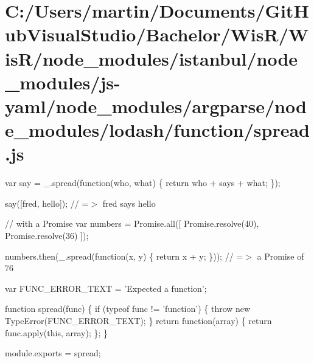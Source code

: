 \hypertarget{_c_1_2_users_2martin_2_documents_2_git_hub_visual_studio_2_bachelor_2_wis_r_2_wis_r_2node_modulea7f316474b757c43d9fdea0493cc8bee}{}\section{C\+:/\+Users/martin/\+Documents/\+Git\+Hub\+Visual\+Studio/\+Bachelor/\+Wis\+R/\+Wis\+R/node\+\_\+modules/istanbul/node\+\_\+modules/js-\/yaml/node\+\_\+modules/argparse/node\+\_\+modules/lodash/function/spread.\+js}
var say = \+\_\+.\+spread(function(who, what) \{ return who + \textquotesingle{} says \textquotesingle{} + what; \});

say(\mbox{[}\textquotesingle{}fred\textquotesingle{}, \textquotesingle{}hello\textquotesingle{}\mbox{]}); // =$>$ \textquotesingle{}fred says hello\textquotesingle{}

// with a Promise var numbers = Promise.\+all(\mbox{[} Promise.\+resolve(40), Promise.\+resolve(36) \mbox{]});

numbers.\+then(\+\_\+.\+spread(function(x, y) \{ return x + y; \})); // =$>$ a Promise of 76


\begin{DoxyCodeInclude}

var FUNC\_ERROR\_TEXT = \textcolor{stringliteral}{'Expected a function'};

\textcolor{keyword}{function} spread(func) \{
  \textcolor{keywordflow}{if} (typeof func != \textcolor{stringliteral}{'function'}) \{
    \textcolor{keywordflow}{throw} \textcolor{keyword}{new} TypeError(FUNC\_ERROR\_TEXT);
  \}
  \textcolor{keywordflow}{return} \textcolor{keyword}{function}(array) \{
    \textcolor{keywordflow}{return} func.apply(\textcolor{keyword}{this}, array);
  \};
\}

module.exports = spread;
\end{DoxyCodeInclude}
 